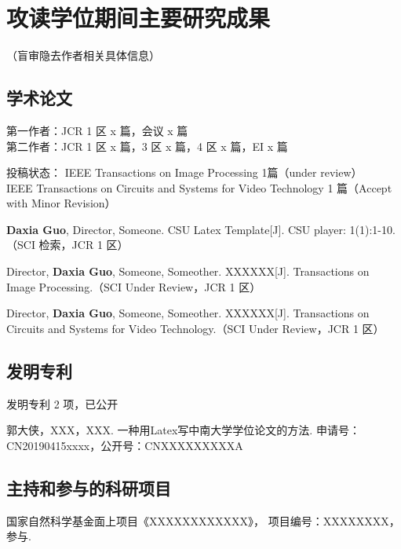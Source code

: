\section{攻读学位期间主要研究成果} %

\ifblindreview
\noindent
（盲审隐去作者相关具体信息）
\fi
\subsection*{学术论文}

\ifblindreview

\noindent
第一作者：JCR 1 区 x 篇，会议 x 篇 \\{}
第二作者：JCR 1 区 x 篇，3 区 x 篇，4 区 x 篇，EI x 篇 

\noindent
投稿状态： 
IEEE Transactions on Image Processing 1篇（under review）\\{}
IEEE Transactions on Circuits and Systems for Video Technology 1 篇（Accept with Minor Revision）
\else
\begin{enumerate}[label={[\arabic*]}]
\item \textbf{Daxia Guo}, Director, Someone. CSU Latex Template[J]. CSU player: 1(1):1-10. （SCI 检索，JCR 1 区）
\item Director, \textbf{Daxia Guo}, Someone, Someother. XXXXXX[J]. Transactions on Image Processing.（SCI Under Review，JCR 1 区）
\item Director, \textbf{Daxia Guo}, Someone, Someother. XXXXXX[J]. Transactions on Circuits and Systems for Video Technology.（SCI Under Review，JCR 1 区）
\end{enumerate}
\fi
\subsection*{发明专利}
\ifblindreview
\noindent
发明专利 2 项，已公开
\else
\begin{enumerate}[label={[\arabic*]}]
\item 郭大侠，XXX，XXX. 一种用Latex写中南大学学位论文的方法. 申请号：CN20190415xxxx，公开号：CNXXXXXXXXXA
\end{enumerate}
\fi

\ifblindreview
\else
\subsection*{主持和参与的科研项目}
\begin{enumerate}[label={[\arabic*]}]
\item 国家自然科学基金面上项目《XXXXXXXXXXXX》， 项目编号：XXXXXXXX，参与.
\end{enumerate}

